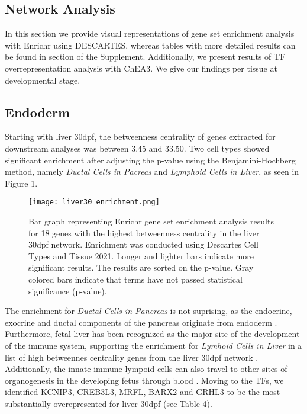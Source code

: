 \documentclass[
	a4paper, %
	10pt, %
	unnumberedsections, %
	twoside, %
]{LTJournalArticle}
\begin{document}
\subsection{\normalsize Network Analysis}\label{netanal}
In this section we provide visual representations of gene set enrichment analysis with Enrichr using DESCARTES, 
whereas tables with more detailed results can be found in  section of the Supplement. 
Additionally, we present results of TF overrepresentation analysis with ChEA3. We give our findings
per tissue at developmental stage.

\subsection{\small Endoderm}
Starting with liver 30dpf, the betweenness centrality of genes extracted for  
downstream analyses was between 3.45 and 33.50. 
Two cell types showed significant enrichment after 
adjusting the p-value using the Benjamini-Hochberg method, namely \textit{Ductal Cells in Pacreas}
and \textit{Lymphoid Cells in Liver}, as seen in Figure 1.

\begin{figure}[H] %
	\texttt{[image: liver30\_enrichment.png]}
	\caption{Bar graph representing Enrichr gene set enrichment analysis results for 18 genes
	with the highest betweenness centrality in the liver 30dpf network. Enrichment 
	was conducted using Descartes Cell Types and Tissue 2021. Longer and lighter
	bars indicate more significant results. The results are sorted on
	the p-value. Gray colored bars indicate that terms 
	have not passed statistical significance (p-value).}
	\label{fig:liv30enr}
\end{figure}

\noindent The enrichment for \textit{Ductal Cells in Pancreas} is not suprising, as
the endocrine, exocrine and ductal components of the pancreas originate from endoderm \autocite{mccracken2012a}. 
Furthermore, fetal liver has been recognized as the major site of the development of 
the immune system, supporting the enrichment for \textit{Lymhoid Cells in Liver} in 
a list of high betweennes centrality genes from the liver 30dpf network \autocite{gale1987a}. Additionally,
the innate immune lympoid cells can also travel to other sites of organogenesis in the developing
fetus through blood \autocite{miller2018a}. Moving to the TFs, we identified KCNIP3, CREB3L3,
MRFL, BARX2 and GRHL3 to be the most substantially overepresented for liver 30dpf (see Table 4). 
\end{document}
